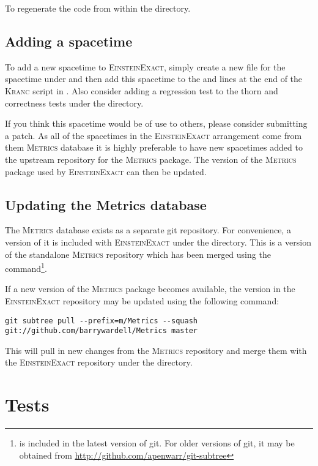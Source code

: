 \documentclass{article}
\begin{document}
To regenerate the code  from within the  directory.

\subsection{Adding a spacetime}
To add a new spacetime to \textsc{EinsteinExact}, simply create a new file
for the spacetime under  and then add this spacetime
to the  and  lines at the end
of the \textsc{Kranc} script in . Also consider adding
a regression test to the  thorn and correctness tests
under the  directory.

If you think this spacetime would be of use to others, please consider 
submitting a patch. As all of the spacetimes in the \textsc{EinsteinExact}
arrangement come from them \textsc{Metrics} database it is highly preferable to
have new spacetimes added to the upstream repository for the \textsc{Metrics}
package. The version of the \textsc{Metrics} package used by
\textsc{EinsteinExact} can then be updated.

\subsection{Updating the Metrics database}
The \textsc{Metrics} database exists as a separate git repository. For
convenience, a version of it is included with \textsc{EinsteinExact} under
the  directory. This is a version of the standalone
\textsc{Metrics} repository which has been merged using the 
command\footnote{ is included in the latest version of git.
For older versions of git, it may be obtained from
\url{http://github.com/apenwarr/git-subtree}}.

If a new version of the \textsc{Metrics} package becomes available, the version
in the \textsc{EinsteinExact} repository may be updated using the following
command:
\begin{verbatim}
git subtree pull --prefix=m/Metrics --squash git://github.com/barrywardell/Metrics master
\end{verbatim}
This will pull in new changes from the \textsc{Metrics} repository and merge
them with the \textsc{EinsteinExact} repository under the 
directory.

\section{Tests}
\end{document}
